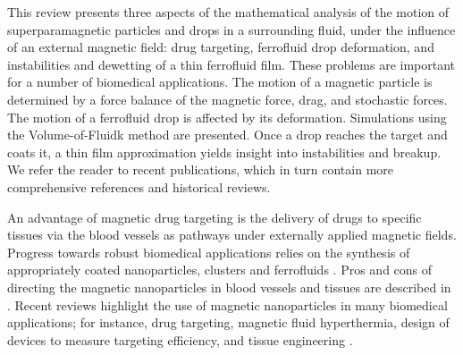   This review presents three aspects of the mathematical analysis of the motion of superparamagnetic particles and drops in a surrounding fluid, under the 
influence of an external 
magnetic field: drug targeting, ferrofluid drop deformation, and instabilities and dewetting of a thin ferrofluid film. 
 These problems are important for a number of biomedical applications.
  The motion of a magnetic particle is determined by a force balance of the magnetic force, drag, and stochastic forces. The motion of a ferrofluid drop is 
affected by its deformation. 
  Simulations  using the Volume-of-Fluidk method are presented. Once a drop reaches the target and coats it, a thin film approximation yields insight into 
instabilities and breakup.    We refer the
reader to  recent publications, which in turn contain more  comprehensive references and historical reviews.

  
An advantage of magnetic drug targeting is the delivery of drugs 
to  specific tissues via  the blood vessels as pathways under  externally  
applied magnetic fields. Progress towards  robust biomedical applications  
 relies on the synthesis of appropriately coated nanoparticles, clusters 
 and ferrofluids \cite{Liu2007,ATRRWPR,Bala2014,Dung2017}.  Pros and 
cons of 
directing the magnetic nanoparticles in blood vessels and tissues are 
described in 
\cite{Voltairas02,Neuberger2005,Buzea2007,Berry2009,Mishra2010,Nacev2011}. Recent reviews 
highlight the use of magnetic 
nanoparticles in many biomedical applications; for instance,  drug targeting, magnetic fluid hyperthermia, 
   design of devices to measure targeting efficiency, and tissue engineering
\cite{Ito2005,Puri2014,Maguire2014,aljamal2016,Mohammed2017,Radon2017}. 

